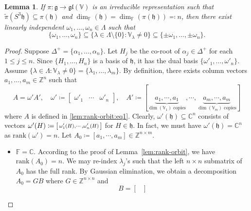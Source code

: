 \documentclass[11pt,reqno]{amsart}
\newtheorem{lemma}[theorem]{Lemma}
\newcommand{\rank}{\mathrm{rank}} %
\newcommand{\CC}{\mathbb{C}} %
\newcommand{\FF}{\mathbb{F}} %
\begin{document}
\begin{lemma}\label{prop: Gauss elimination}
If $\pi: \mathfrak{g} \to \mathfrak{gl}(\mathbb{V})$ is an irreducible representation such that $\widetilde{\pi} \left( S^3 \mathfrak{h}\right)\subseteq \pi(\mathfrak{h})$ and  $\dim_\FF( \mathfrak{h} ) = \dim_\FF(  \pi(\mathfrak{h}) ) \eqqcolon n$,  then there exist {linearly independent} $\omega_1,\dots,  \omega_n \in \Lambda$ such that 
\[
\{\omega_1,\dots,  \omega_n\} \subseteq 
\{\lambda\in \Lambda\setminus \{0\}: \mathbb{V}_{\lambda} \ne 0\}
\subseteq 
\{\pm \omega_1,\dots,  \pm \omega_n\}. 
\]
\end{lemma}
\begin{proof}
Suppose $\Delta^+ = \{\alpha_1,\dots,  \alpha_n\}$.  Let $H_j$ be the co-root of $\alpha_j \in \Delta^+$ for each $1 \le j \le n $.  Since $\{H_1,\dots,  H_n\}$ is a basis of $\mathfrak{h}$,  it has the dual basis $\{\omega'_1,\dots,  \omega'_n\}$.  Assume $\{\lambda\in \Lambda: \mathbb{V}_{\lambda} \ne 0\}= \{ \lambda_1,  \dots,  \lambda_m \}$.  By definition,  there exists column vectors $a_1,\dots,  a_m \in \mathbb{Z}^{n}$ such that 
\begin{equation}\label{prop: Gauss elimination:eq1}
A =  \omega'  A',  \quad \omega'\coloneqq  \begin{bmatrix}
\omega'_1 &
\cdots &
\omega'_n
\end{bmatrix},\quad A' \coloneqq [
\underbrace{a_1,  \cdots,  a_1}_{\dim(\mathbb{V}_1) \text{~copies}},  \cdots,  \underbrace{a_m,  \cdots,  a_m}_{\dim(\mathbb{V}_m) \text{~copies}} ]
\end{equation}
where $A$ is defined in \eqref{lem:rank-orbit:eq1}.  Clearly,  $\omega'(\mathfrak{h}) \subseteq \mathbb{C}^n$ consists of vectors $\omega'(H) \coloneqq \begin{bsmallmatrix} \omega'_1(H),\cdots,  \omega'_n(H)
\end{bsmallmatrix}$ for $H\in \mathfrak{h}$.  In fact,  we must have $\omega'(\mathfrak{h}) = \mathbb{C}^n$ as $\rank (\omega') = n$.  Let $A_0 \coloneqq [
a_1, \cdots,  a_m] \in \mathbb{Z}^{n \times m}$.
\begin{itemize}
\item[$\diamond$] $\FF=\CC$.  According to the proof of Lemma~\ref{lem:rank-orbit},  we have $\rank(A_0) = n$.  We may re-index $\lambda_j$'s such that the left $n\times n$ submatrix of $A_0$ has the full rank.  By Gaussian elimination,  we obtain a decomposition $A_0 = GB$ where $G \in \mathbb{Z}^{n\times n}$ and 
\[
B = \begin{bmatrix}

\end{bmatrix}\]
\end{itemize}
\end{proof}
\end{document}
